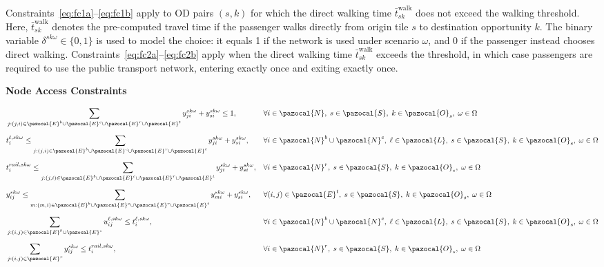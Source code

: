 \documentclass[3p,times,procedia]{elsarticle}
\begin{document}
Constraints~\eqref{eq:fc1a}–\eqref{eq:fc1b} apply to OD pairs \((s,k)\) for which the direct walking time \(\bar{t}_{sk}^{\text{walk}}\) does not exceed the walking threshold.  
Here, \(\bar{t}_{sk}^{\text{walk}}\) denotes the pre-computed travel time if the passenger walks directly from origin tile \(s\) to destination opportunity \(k\).  
The binary variable \(\delta^{sk\omega}\in\{0,1\}\) is used to model the choice: it equals 1 if the network is used under scenario \(\omega\), and 0 if the passenger instead chooses direct walking.  
%
Constraints~\eqref{eq:fc2a}–\eqref{eq:fc2b} apply when the direct walking time \(\bar{t}_{sk}^{\text{walk}}\) exceeds the threshold, in which case passengers are required to use the public transport network, entering exactly once and exiting exactly once.

\textbf{Node Access Constraints}

\begin{align}
& \sum_{j:(j,i) \in \pazocal{E}^b \cup \pazocal{E}^c \cup \pazocal{E}^r \cup \pazocal{E}^t} y_{ji}^{sk\omega} + y_{si}^{sk\omega} \leq 1, 
&& \forall i \in \pazocal{N},\; s \in \pazocal{S},\; k \in \pazocal{O}_s,\; \omega \in \Omega 
\label{eq:na1} \\[6pt]
& t_{i}^{\ell,sk\omega} \leq \sum_{j:(j,i) \in \pazocal{E}^b \cup \pazocal{E}^c \cup \pazocal{E}^r \cup \pazocal{E}^t} y_{ji}^{sk\omega} + y_{si}^{sk\omega}, 
&& \forall i \in \pazocal{N}^b \cup \pazocal{N}^c,\; \ell \in \pazocal{L},\; s \in \pazocal{S},\; k \in \pazocal{O}_s,\; \omega \in \Omega 
\label{eq:na2a} \\[6pt]
& t_{i}^{rail,sk\omega} \leq \sum_{j:(j,i) \in \pazocal{E}^b \cup \pazocal{E}^c \cup \pazocal{E}^r \cup \pazocal{E}^t} y_{ji}^{sk\omega} + y_{si}^{sk\omega}, 
&& \forall i \in \pazocal{N}^r,\; s \in \pazocal{S},\; k \in \pazocal{O}_s,\; \omega \in \Omega 
\label{eq:na2b} \\[6pt]
& y_{ij}^{sk\omega} \leq \sum_{m:(m,i) \in \pazocal{E}^b \cup \pazocal{E}^c \cup \pazocal{E}^r \cup \pazocal{E}^t} y_{mi}^{sk\omega} + y_{si}^{sk\omega}, 
&& \forall (i,j) \in \pazocal{E}^t,\; s \in \pazocal{S},\; k \in \pazocal{O}_s,\; \omega \in \Omega 
\label{eq:na3} \\[6pt]
& \sum_{j:(i,j) \in \pazocal{E}^b \cup \pazocal{E}^c} u_{ij}^{\ell,sk\omega} \leq t_{i}^{\ell,sk\omega}, 
&& \forall i \in \pazocal{N}^b \cup \pazocal{N}^c,\; \ell \in \pazocal{L},\; s \in \pazocal{S},\; k \in \pazocal{O}_s,\; \omega \in \Omega 
\label{eq:na4a} \\[6pt]
& \sum_{j:(i,j) \in \pazocal{E}^r} y_{ij}^{sk\omega} \leq t_{i}^{rail,sk\omega}, 
&& \forall i \in \pazocal{N}^r,\; s \in \pazocal{S},\; k \in \pazocal{O}_s,\; \omega \in \Omega 
\label{eq:na4b}
\end{align}
\end{document}
